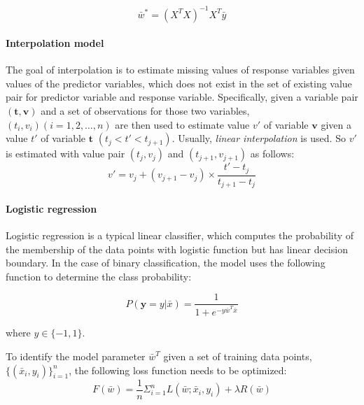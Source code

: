 \begin{equation}\label{eq: regression_solve_simple_final}
    \bar{w}^*=(X^TX)^{-1}X^T\bar{y}
\end{equation}


\paragraph{Interpolation model} 

The goal of interpolation is to estimate missing values of response variables given values of the predictor variables, which does not exist in the set of existing value pair for predictor variable and response variable. Specifically, given a variable pair $(\textbf{t},\textbf{v})$ and a set of observations for those two variables, $(t_i, v_i)(i=1,2,\dots,n)$ are then used to estimate value $v'$ of variable $\textbf{v}$ given a value $t'$ of variable $\textbf{t}$ $(t_j< t' < t_{j+1})$. Usually, {\em linear interpolation} is used. So $v'$ is estimated with value pair $(t_j, v_j)$ and $(t_{j+1}, v_{j+1})$ as follows:
\begin{equation}\label{eq: interpolation}
    v'= v_j + (v_{j+1}-v_j)\times\frac{t'-t_j}{t_{j+1}-t_j}
\end{equation}



\paragraph{Logistic regression}
Logistic regression is a typical linear classifier, which computes the probability of the membership of the data points with logistic function but has linear decision boundary. In the case of binary classification, the model uses the following function to determine the class probability:

\begin{equation}\label{eq: logistic_regression_prob}
    P(\textbf{y}=y|\bar{x}) = \frac{1}{1+e^{-y\bar{w}^T\bar{x}}}
\end{equation}

where $y \in \{-1,1\}$.

To identify the model parameter $\bar{w}^T$ given a set of training data points, $\{(\bar{x}_i, y_i)\}_{i=1}^n$, the following loss function needs to be optimized:
\begin{equation}\label{eq: logistic_objective_function}
    F(\bar{w}) = \frac{1}{n}\Sigma_{i=1}^nL(\bar{w};\bar{x}_i, y_i) + \lambda R(\bar{w})
\end{equation}


